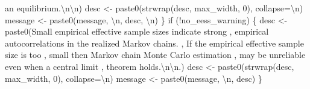 \documentclass[
  letterpaper,
  DIV=11,
  numbers=noendperiod]{scrartcl}
\newenvironment{Shaded}{\begin{snugshade}}{\end{snugshade}}
\newcommand{\AttributeTok}[1]{\textcolor[rgb]{0.40,0.45,0.13}{#1}}
\newcommand{\ControlFlowTok}[1]{\textcolor[rgb]{0.00,0.23,0.31}{#1}}
\newcommand{\DecValTok}[1]{\textcolor[rgb]{0.68,0.00,0.00}{#1}}
\newcommand{\FunctionTok}[1]{\textcolor[rgb]{0.28,0.35,0.67}{#1}}
\newcommand{\NormalTok}[1]{\textcolor[rgb]{0.00,0.23,0.31}{#1}}
\newcommand{\OtherTok}[1]{\textcolor[rgb]{0.00,0.23,0.31}{#1}}
\newcommand{\SpecialCharTok}[1]{\textcolor[rgb]{0.37,0.37,0.37}{#1}}
\newcommand{\StringTok}[1]{\textcolor[rgb]{0.13,0.47,0.30}{#1}}
\begin{document}
\begin{Shaded}
\begin{Highlighting}[]
                   \StringTok{\textquotesingle{}an equilibrium.}\SpecialCharTok{\textbackslash{}n\textbackslash{}n}\StringTok{\textquotesingle{}}\NormalTok{)}
\NormalTok{    desc }\OtherTok{\textless{}{-}} \FunctionTok{paste0}\NormalTok{(}\FunctionTok{strwrap}\NormalTok{(desc, max\_width, }\DecValTok{0}\NormalTok{), }\AttributeTok{collapse=}\StringTok{\textquotesingle{}}\SpecialCharTok{\textbackslash{}n}\StringTok{\textquotesingle{}}\NormalTok{)}
\NormalTok{    message }\OtherTok{\textless{}{-}} \FunctionTok{paste0}\NormalTok{(message, }\StringTok{\textquotesingle{}}\SpecialCharTok{\textbackslash{}n}\StringTok{\textquotesingle{}}\NormalTok{, desc, }\StringTok{\textquotesingle{}}\SpecialCharTok{\textbackslash{}n}\StringTok{\textquotesingle{}}\NormalTok{)}
\NormalTok{  \}}
  \ControlFlowTok{if}\NormalTok{ (}\SpecialCharTok{!}\NormalTok{no\_eess\_warning) \{}
\NormalTok{    desc }\OtherTok{\textless{}{-}} \FunctionTok{paste0}\NormalTok{(}\StringTok{\textquotesingle{}Small empirical effective sample sizes indicate strong \textquotesingle{}}\NormalTok{,}
                   \StringTok{\textquotesingle{}empirical autocorrelations in the realized Markov chains. \textquotesingle{}}\NormalTok{,}
                   \StringTok{\textquotesingle{}If the empirical effective sample size is too \textquotesingle{}}\NormalTok{,}
                   \StringTok{\textquotesingle{}small then Markov chain Monte Carlo estimation \textquotesingle{}}\NormalTok{,}
                   \StringTok{\textquotesingle{}may be unreliable even when a central limit \textquotesingle{}}\NormalTok{,}
                   \StringTok{\textquotesingle{}theorem holds.}\SpecialCharTok{\textbackslash{}n\textbackslash{}n}\StringTok{.\textquotesingle{}}\NormalTok{)}
\NormalTok{    desc }\OtherTok{\textless{}{-}} \FunctionTok{paste0}\NormalTok{(}\FunctionTok{strwrap}\NormalTok{(desc, max\_width, }\DecValTok{0}\NormalTok{), }\AttributeTok{collapse=}\StringTok{\textquotesingle{}}\SpecialCharTok{\textbackslash{}n}\StringTok{\textquotesingle{}}\NormalTok{)}
\NormalTok{    message }\OtherTok{\textless{}{-}} \FunctionTok{paste0}\NormalTok{(message, }\StringTok{\textquotesingle{}}\SpecialCharTok{\textbackslash{}n}\StringTok{\textquotesingle{}}\NormalTok{, desc)}
\NormalTok{  \}}


\end{Highlighting}
\end{Shaded}
\end{document}
